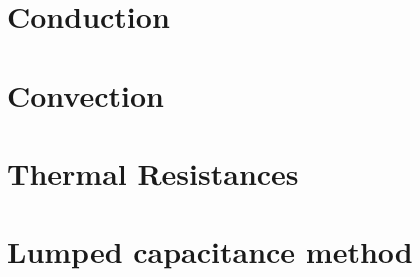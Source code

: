 \documentclass[numerate]{cheatsheet}
\author{Christian Leser (cleser@ethz.ch) \\ \vspace*{-0.2em}}
\begin{document}
\section{Conduction}
	
	
	

\section{Convection}
	

\section{Thermal Resistances}
	

\section{Lumped capacitance method}
	

\end{document}
